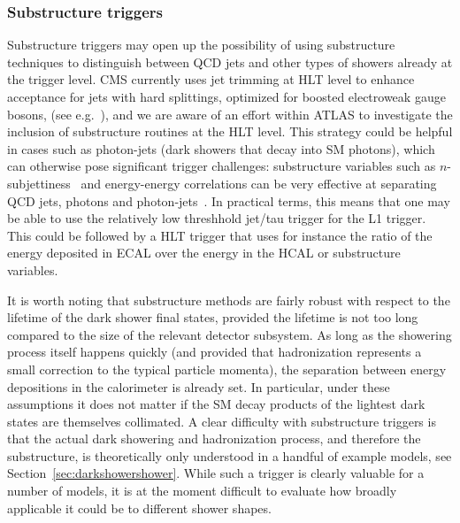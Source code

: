 \subsubsection{Substructure triggers}
Substructure triggers may open up the possibility of using substructure techniques to distinguish between QCD jets and other types of showers already at the trigger level.
CMS currently uses jet trimming at HLT level to enhance acceptance for jets with hard splittings, optimized for boosted electroweak gauge bosons, (see e.g.~\cite{Sirunyan:2017wto,Sirunyan:2017acf}), and we are aware of an effort within ATLAS to investigate the inclusion of substructure routines at the HLT level.   This strategy could be helpful in cases such as photon-jets (dark showers that decay into SM photons), which can otherwise pose significant trigger challenges: substructure variables such as $n$-subjettiness~\cite{Thaler:2010tr} and energy-energy correlations can be very effective at separating QCD jets, photons and photon-jets~\cite{Ellis:2012sd,Ellis:2012zp}. In practical terms, this means that one may be able to use the relatively low threshhold jet/tau trigger for the L1 trigger.  This could be followed by a HLT trigger that uses for instance the ratio of the energy deposited in ECAL over the energy in the HCAL or substructure variables.

It is worth noting that  substructure methods are fairly robust with respect to the lifetime of the dark shower final states, provided the lifetime is not too long compared to the size of the relevant detector subsystem. As long as the showering process itself happens quickly (and provided that hadronization represents a small correction to the typical particle momenta), %
the separation between energy depositions in the calorimeter is already set.  In particular, under these assumptions it does not matter if the SM decay products of the lightest dark states are themselves collimated. %
A clear difficulty with substructure triggers is that the actual dark showering and hadronization process, and therefore the substructure, is theoretically only understood in a handful of example models, see Section~\ref{sec:darkshowershower}. While such a trigger is clearly valuable for a number of models, it is at the moment difficult to evaluate how broadly applicable it could be to different shower shapes.

